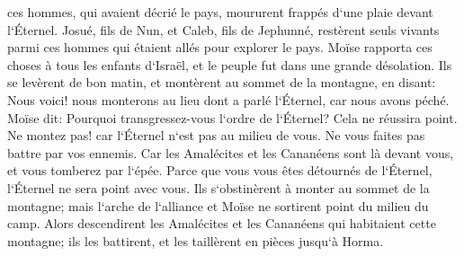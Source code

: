 \verse ces hommes, qui avaient décrié le pays, moururent frappés d`une plaie devant l`Éternel. 
\verse Josué, fils de Nun, et Caleb, fils de Jephunné, restèrent seuls vivants parmi ces hommes qui étaient allés pour explorer le pays. 
\verse Moïse rapporta ces choses à tous les enfants d`Israël, et le peuple fut dans une grande désolation. 
\verse Ils se levèrent de bon matin, et montèrent au sommet de la montagne, en disant: Nous voici! nous monterons au lieu dont a parlé l`Éternel, car nous avons péché. 
\verse Moïse dit: Pourquoi transgressez-vous l`ordre de l`Éternel? Cela ne réussira point. 
\verse Ne montez pas! car l`Éternel n`est pas au milieu de vous. Ne vous faites pas battre par vos ennemis. 
\verse Car les Amalécites et les Cananéens sont là devant vous, et vous tomberez par l`épée. Parce que vous vous êtes détournés de l`Éternel, l`Éternel ne sera point avec vous. 
\verse Ils s`obstinèrent à monter au sommet de la montagne; mais l`arche de l`alliance et Moïse ne sortirent point du milieu du camp. 
\verse Alors descendirent les Amalécites et les Cananéens qui habitaient cette montagne; ils les battirent, et les taillèrent en pièces jusqu`à Horma. 

